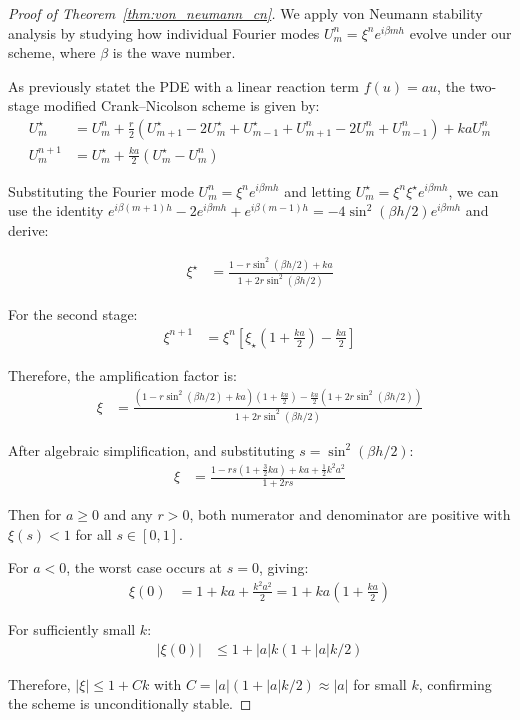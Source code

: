\begin{proof}[Proof of Theorem~\ref{thm:von_neumann_cn}]
  We apply von Neumann stability analysis by studying how individual Fourier modes $U_m^n = \xi^n e^{i\beta mh}$
  evolve under our scheme, where $\beta$ is the wave number.

  As previously statet the PDE with a linear reaction term $f(u) = au$, the two-stage modified Crank--Nicolson
  scheme is given by:
  \begin{align*}
    U_m^\star & = U_m^n + \frac{r}{2}\left(U_{m+1}^\star - 2U_m^\star + U_{m-1}^\star + U_{m+1}^n - 2U_m^n + U_{m-1}^n\right) + kaU_m^n \\
    U_m^{n+1} & = U_m^\star + \frac{ka}{2}(U_m^\star - U_m^n)
  \end{align*}

  Substituting the Fourier mode $U_m^n = \xi^n e^{i\beta mh}$ and letting
  $U_m^\star = \xi^n \xi^\star e^{i\beta mh}$, we can use the identity
  $e^{i\beta (m+1)h} - 2e^{i\beta mh} + e^{i\beta (m-1)h} = -4\sin^2(\beta h/2)e^{i\beta mh}$ and derive:

  \begin{align*}
    \xi^\star & = \frac{1 - r\sin^2(\beta h/2) + ka}{1 + 2r\sin^2(\beta h/2)}
  \end{align*}

  For the second stage:
  \begin{align*}
    \xi^{n+1} & = \xi^n\left[\xi_\star\left(1 + \frac{ka}{2}\right) - \frac{ka}{2}\right]
  \end{align*}

  Therefore, the amplification factor is:
  \begin{align*}
    \xi & = \frac{\left(1 - r\sin^2(\beta h/2) + ka\right)\left(1 + \frac{ka}{2}\right) - \frac{ka}{2}\left(1 + 2r\sin^2(\beta h/2)\right)}{1 + 2r\sin^2(\beta h/2)}
  \end{align*}

  After algebraic simplification, and substituting $s = \sin^2(\beta h/2)$:
  \begin{align*}
    \xi & = \frac{1 - rs(1 + \tfrac{3}{2}ka) + ka + \tfrac{1}{2}k^2a^2}{1 + 2rs}
  \end{align*}

  Then for $a \geq 0$ and any $r > 0$, both numerator and denominator are positive with $\xi(s) < 1$ for all
  $s \in [0,1]$.

  \medskip

  For $a < 0$, the worst case occurs at $s = 0$, giving:
  \begin{align*}
    \xi(0) & = 1 + ka + \frac{k^2a^2}{2} = 1 + ka\left(1 + \frac{ka}{2}\right)
  \end{align*}

  For sufficiently small $k$:
  \begin{align*}
    |\xi(0)| & \leq 1 + |a|k(1 + |a|k/2)
  \end{align*}

  Therefore, $|\xi| \leq 1 + Ck$ with $C = |a|(1 + |a|k/2) \approx |a|$ for small $k$, confirming the scheme is unconditionally stable.
\end{proof}


